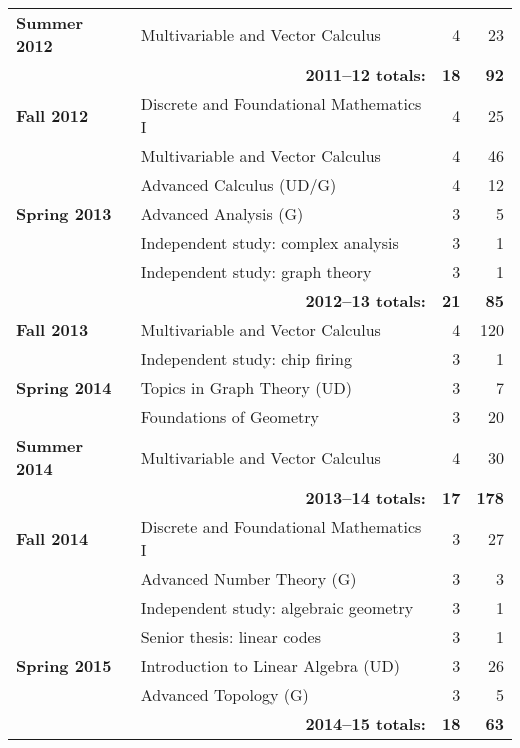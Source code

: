 \documentclass[12pt]{article}
\begin{document}
\begin{center}
\begin{longtable}{@{} l @{\hspace{1ex}} l @{} rr @{}}
\textbf{Summer 2012} & Multivariable and Vector Calculus & 4 & 23 \\
 \cmidrule{2-4}
 & \multicolumn{1}{r}{\textbf{2011--12 totals:}} & \textbf{18} & \textbf{92} \\
 \cmidrule{2-4}

\textbf{Fall 2012} & Discrete and Foundational Mathematics I & 4 & 25 \\
 & Multivariable and Vector Calculus & 4 & 46 \\
 & Advanced Calculus (UD/G) & 4 & 12 \\
\addlinespace[0.1in]

\textbf{Spring 2013} & Advanced Analysis (G) & 3 & 5 \\
 & Independent study: complex analysis & 3 & 1 \\
 & Independent study: graph theory & 3 & 1 \\
 \cmidrule{2-4}
 & \multicolumn{1}{r}{\textbf{2012--13 totals:}} & \textbf{21} & \textbf{85} \\
 \cmidrule{2-4}

\textbf{Fall 2013} & Multivariable and Vector Calculus & 4 & 120 \\
  & Independent study: chip firing & 3 & 1 \\
\addlinespace[0.1in]

\textbf{Spring 2014} & Topics in Graph Theory (UD) & 3 & 7 \\
 & Foundations of Geometry & 3 & 20 \\
\addlinespace[0.1in]

\textbf{Summer 2014} & Multivariable and Vector Calculus & 4 & 30 \\
 \cmidrule{2-4}
 & \multicolumn{1}{r}{\textbf{2013--14 totals:}} & \textbf{17} & \textbf{178} \\
 \cmidrule{2-4}

\textbf{Fall 2014} & Discrete and Foundational Mathematics I & 3 & 27 \\
 & Advanced Number Theory (G) & 3 & 3 \\
 & Independent study: algebraic geometry & 3 & 1 \\
 & Senior thesis: linear codes & 3 & 1 \\
\addlinespace[0.1in]

\textbf{Spring 2015} & Introduction to Linear Algebra (UD) & 3 & 26 \\
 & Advanced Topology (G) & 3 & 5 \\
 \cmidrule{2-4}
 & \multicolumn{1}{r}{\textbf{2014--15 totals:}} & \textbf{18} & \textbf{63} \\
 \cmidrule{2-4}


\end{longtable}
\end{center}
\end{document}
